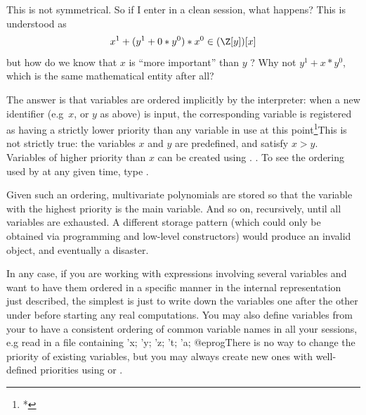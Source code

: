 This is not symmetrical. So if I enter  in a clean session,
what happens? This is understood as
$$ x^1 + (y^1 + 0*y^0)*x^0 \in (\Z[y])[x] $$
but how do we know that $x$ is ``more important'' than $y$ ? Why not $y^1 +
x*y^0$, which is the same mathematical entity after all?

The answer is that variables are ordered implicitly by the interpreter:
when a new identifier (e.g~$x$, or $y$ as above) is input, the corresponding
variable is registered as having a strictly lower priority than any variable in
use at this point\footnote{*}{This is not strictly true:
the variables $x$ and $y$ are predefined, and satisfy $x > y$.
Variables of higher priority than $x$ can be created
using .}%
. To see the ordering used by  at any given time, type
.

Given such an ordering, multivariate polynomials are stored so that the
variable with the highest priority is the main variable. And so on,
recursively, until all variables are exhausted. A different storage pattern
(which could only be obtained via  programming and low-level
constructors) would produce an invalid object, and eventually a disaster.

In any case, if you are working with expressions involving several variables
and want to have them ordered in a specific manner in the internal
representation just described, the simplest is just to write down the
variables one after the other under  before starting any real
computations. You may also define variables from your  to have a
consistent ordering of common variable names in all your  sessions,
e.g read in a file  containing
\bprog
'x; 'y; 'z; 't; 'a;
@eprog\noindent There is no way to change the priority of existing variables,
but you may always create new ones with well-defined priorities using
 or .

